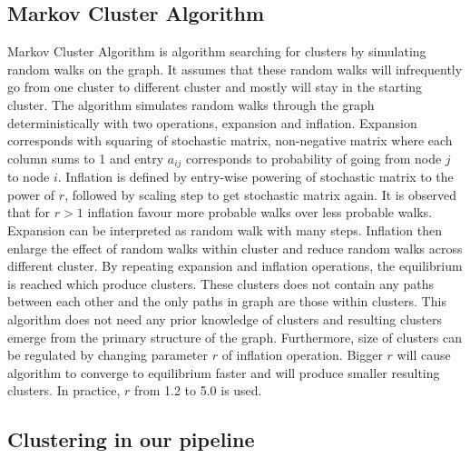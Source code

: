 \subsection{Markov Cluster Algorithm}
Markov Cluster Algorithm is algorithm searching for clusters by simulating random walks on the graph.
It assumes that these random walks will infrequently go from one cluster to different cluster and mostly will stay in the starting cluster.
The algorithm simulates random walks through the graph deterministically with two operations, expansion and inflation.
Expansion corresponds with squaring of stochastic matrix, non-negative matrix where each column sums to 1 and entry $a_{ij}$ corresponds to probability of going from node $j$ to node $i$.
Inflation is defined by entry-wise powering of stochastic matrix to the power of $r$, followed by scaling step to get stochastic matrix again.
It is observed that for $r>1$ inflation favour more probable walks over less probable walks.
Expansion can be interpreted as random walk with many steps.
Inflation then enlarge the effect of random walks within cluster and reduce random walks across different cluster.
By repeating expansion and inflation operations, the equilibrium is reached which produce clusters.
These clusters does not contain any paths between each other and the only paths in graph are those within clusters.
This algorithm does not need any prior knowledge of clusters and resulting clusters emerge from the primary structure of the graph.
Furthermore, size of clusters can be regulated by changing parameter $r$ of inflation operation.
Bigger $r$ will cause algorithm to converge to equilibrium faster and will produce smaller resulting clusters.
In practice, $r$ from 1.2 to 5.0 is used.


\subsection{Clustering in our pipeline}
